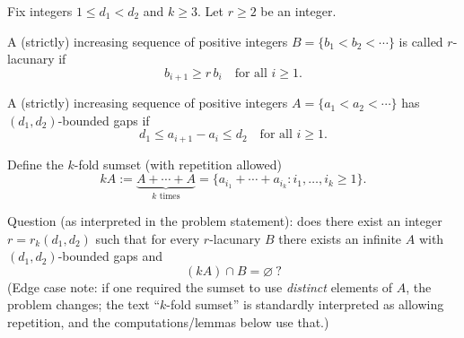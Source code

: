 Fix integers \(1\le d_1<d_2\) and \(k\ge 3\).  Let \(r\ge 2\) be an integer.

A (strictly) increasing sequence of positive integers \(B=\{b_1<b_2<\cdots\}\) is called \(r\)-lacunary if
\[
 b_{i+1}\ge r\,b_i\quad\text{for all }i\ge 1.
\]

A (strictly) increasing sequence of positive integers \(A=\{a_1<a_2<\cdots\}\) has \((d_1,d_2)\)-bounded gaps if
\[
 d_1\le a_{i+1}-a_i\le d_2\quad\text{for all }i\ge 1.
\]

Define the \(k\)-fold sumset (with repetition allowed)
\[
 kA := \underbrace{A+\cdots +A}_{k\text{ times}}=\{a_{i_1}+\cdots+a_{i_k}: i_1,\dots,i_k\ge 1\}.
\]

Question (as interpreted in the problem statement): does there exist an integer \(r=r_k(d_1,d_2)\) such that for every \(r\)-lacunary \(B\) there exists an infinite \(A\) with \((d_1,d_2)\)-bounded gaps and
\[
 (kA)\cap B = \varnothing\ ?
\]
(Edge case note: if one required the sumset to use \emph{distinct} elements of \(A\), the problem changes; the text ``\(k\)-fold sumset'' is standardly interpreted as allowing repetition, and the computations/lemmas below use that.)
